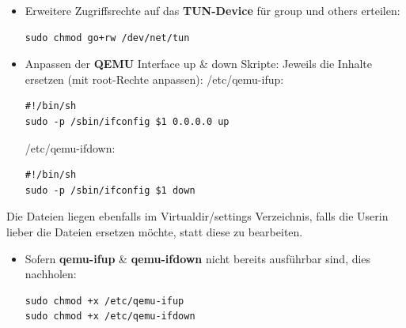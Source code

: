\documentclass[a4,12pt]{scrartcl}
\begin{document}
\begin{itemize}
\item Erweitere Zugriffsrechte auf das \textbf{TUN-Device} für group und others erteilen:
\begin{lstlisting}
sudo chmod go+rw /dev/net/tun
\end{lstlisting}
\end{itemize}

\begin{itemize}
\item Anpassen der \textbf{QEMU} Interface up \& down Skripte:
\newline
Jeweils die Inhalte ersetzen (mit root-Rechte anpassen):
\newline
/etc/qemu-ifup:
\begin{lstlisting}
#!/bin/sh                                                        
sudo -p /sbin/ifconfig $1 0.0.0.0 up
\end{lstlisting}
/etc/qemu-ifdown:
\begin{lstlisting}
#!/bin/sh                                                        
sudo -p /sbin/ifconfig $1 down
\end{lstlisting}
\end{itemize}
Die Dateien liegen ebenfalls im Virtualdir/settings Verzeichnis, falls die Userin lieber die Dateien ersetzen möchte, statt diese zu bearbeiten. 

\begin{itemize}
\item Sofern \textbf{qemu-ifup} \& \textbf{qemu-ifdown} nicht bereits ausführbar sind, dies nachholen:
\begin{lstlisting}
sudo chmod +x /etc/qemu-ifup
sudo chmod +x /etc/qemu-ifdown
\end{lstlisting}
\end{itemize}
\end{document}

